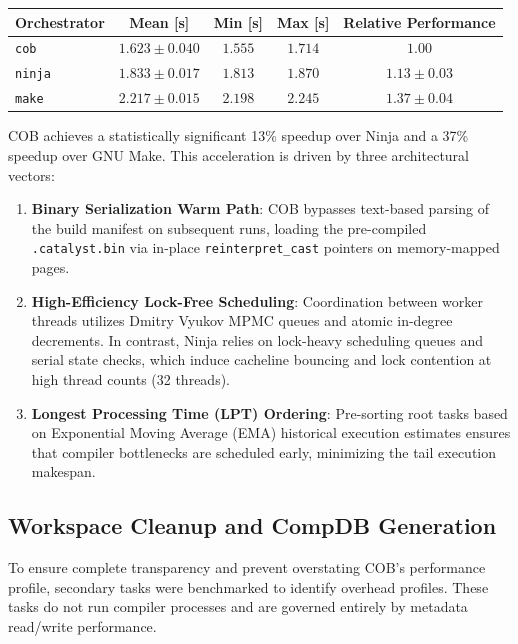 \documentclass[11pt]{article}
\begin{document}
\begin{center}
\renewcommand{\arraystretch}{1.2}
\begin{tabular}{@{}lcccc@{}}
\toprule
\textbf{Orchestrator} & \textbf{Mean [s]} & \textbf{Min [s]} & \textbf{Max [s]} & \textbf{Relative Performance} \\
\midrule
\texttt{cob}   & $1.623 \pm 0.040$ & $1.555$ & $1.714$ & $1.00$ \\
\texttt{ninja} & $1.833 \pm 0.017$ & $1.813$ & $1.870$ & $1.13 \pm 0.03$ \\
\texttt{make}  & $2.217 \pm 0.015$ & $2.198$ & $2.245$ & $1.37 \pm 0.04$ \\
\bottomrule
\end{tabular}
\end{center}

COB achieves a statistically significant 13\% speedup over Ninja and a 37\% speedup over GNU Make.
This acceleration is driven by three architectural vectors:
\begin{enumerate}
    \item \textbf{Binary Serialization Warm Path}: COB bypasses text-based parsing of the build manifest on subsequent runs, loading the pre-compiled \texttt{.catalyst.bin} via in-place \lstinline|reinterpret_cast| pointers on memory-mapped pages.
    \item \textbf{High-Efficiency Lock-Free Scheduling}: Coordination between worker threads utilizes Dmitry Vyukov MPMC queues and atomic in-degree decrements. In contrast, Ninja relies on lock-heavy scheduling queues and serial state checks, which induce cacheline bouncing and lock contention at high thread counts (32 threads).
    \item \textbf{Longest Processing Time (LPT) Ordering}: Pre-sorting root tasks based on Exponential Moving Average (EMA) historical execution estimates ensures that compiler bottlenecks are scheduled early, minimizing the tail execution makespan.
\end{enumerate}

\subsection{Workspace Cleanup and CompDB Generation}

To ensure complete transparency and prevent overstating COB's performance profile, secondary tasks were benchmarked
to identify overhead profiles. These tasks do not run compiler processes and are governed entirely by metadata
read/write performance.
\end{document}
